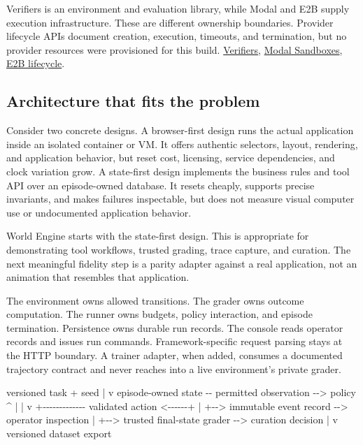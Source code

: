 \documentclass[
  11pt,
  letterpaper,
]{article}
\newenvironment{Shaded}{}{}
\newcommand{\NormalTok}[1]{#1}
\begin{document}
Verifiers is an environment and evaluation library, while Modal and E2B
supply execution infrastructure. These are different ownership
boundaries. Provider lifecycle APIs document creation, execution,
timeouts, and termination, but no provider resources were provisioned
for this build.
\href{https://github.com/PrimeIntellect-ai/verifiers}{Verifiers},
\href{https://modal.com/docs/guide/sandboxes}{Modal Sandboxes},
\href{https://docs.e2b.dev/sandbox}{E2B lifecycle}.

\subsection{Architecture that fits the
problem}\label{architecture-that-fits-the-problem}

Consider two concrete designs. A browser-first design runs the actual
application inside an isolated container or VM. It offers authentic
selectors, layout, rendering, and application behavior, but reset cost,
licensing, service dependencies, and clock variation grow. A state-first
design implements the business rules and tool API over an episode-owned
database. It resets cheaply, supports precise invariants, and makes
failures inspectable, but does not measure visual computer use or
undocumented application behavior.

World Engine starts with the state-first design. This is appropriate for
demonstrating tool workflows, trusted grading, trace capture, and
curation. The next meaningful fidelity step is a parity adapter against
a real application, not an animation that resembles that application.

The environment owns allowed transitions. The grader owns outcome
computation. The runner owns budgets, policy interaction, and episode
termination. Persistence owns durable run records. The console reads
operator records and issues run commands. Framework-specific request
parsing stays at the HTTP boundary. A trainer adapter, when added,
consumes a documented trajectory contract and never reaches into a live
environment's private grader.

\begin{Shaded}
\begin{Highlighting}[]
\NormalTok{versioned task + seed}
\NormalTok{        |}
\NormalTok{        v}
\NormalTok{episode{-}owned state {-}{-} permitted observation {-}{-}\textgreater{} policy}
\NormalTok{        \^{}                                      |}
\NormalTok{        |                                      v}
\NormalTok{        +{-}{-}{-}{-}{-}{-}{-}{-}{-}{-}{-}{-}{-} validated action \textless{}{-}{-}{-}{-}{-}{-}+ }
\NormalTok{        |}
\NormalTok{        +{-}{-}\textgreater{} immutable event record {-}{-}\textgreater{} operator inspection}
\NormalTok{        |}
\NormalTok{        +{-}{-}\textgreater{} trusted final{-}state grader {-}{-}\textgreater{} curation decision}
\NormalTok{                                              |}
\NormalTok{                                              v}
\NormalTok{                                    versioned dataset export}
\end{Highlighting}
\end{Shaded}
\end{document}
